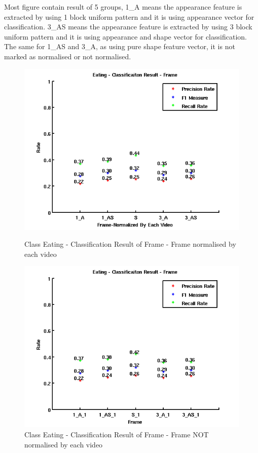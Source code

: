 Most figure contain result of 5 groups, 1\_A means the appearance feature is extracted by using 1 block uniform pattern and it is using appearance vector for classification. 3\_AS means the appearance feature is extracted by using 3 block uniform pattern and it is using appearance and shape vector for classification. The same for 1\_AS and 3\_A, as using pure shape feature vector, it is not marked as normalised or not normalised.
\begin{figure}[ht]
\centering
\begin{minipage}{.5\textwidth}
  \centering
  \captionsetup{justification=centering,margin=1cm}
  \includegraphics[width=\linewidth]{imgs/Result_Eating_Frame.png}
  \caption{Class Eating - Classification Result of Frame - Frame normalised by each video}
  \label{fig:REF}
\end{minipage}%
\begin{minipage}{.5\textwidth}
  \centering
  \captionsetup{justification=centering,margin=1cm}
  \includegraphics[width=\linewidth]{imgs/Result_Eating_Frame_1.png}
  \caption{Class Eating - Classification Result of Frame - Frame NOT normalised by each video}
  \label{fig:REF1}
\end{minipage}
\end{figure}
